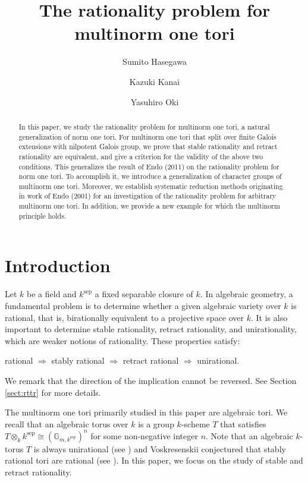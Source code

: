 \documentclass[12pt]{amsart}
\title[Rationality problem]{The rationality problem for multinorm one tori}
\author[S.~Hasegawa]{Sumito Hasegawa}
\author[K.~Kanai]{Kazuki Kanai}
\author[Y.~Oki]{Yasuhiro Oki}
\theoremstyle{plain}
\theoremstyle{definition}
\numberwithin{thm}{section}
\numberwithin{equation}{section}
\newcommand{\G}{\mathbb{G}}
\DeclareMathOperator{\sep}{sep}
\begin{document}
\begin{abstract}
In this paper, we study the rationality problem for multinorm one tori, a natural generalization of norm one tori. 
For multinorm one tori that split over finite Galois extensions with nilpotent Galois group, we prove that stable rationality and retract rationality are equivalent, and give a criterion for the validity of the above two conditions. 
This generalizes the result of Endo (2011) on the rationality problem for norm one tori. 
To accomplish it, 
we introduce a generalization of character groups of multinorm one tori.
Moreover, we establish systematic reduction methods originating in work of Endo (2001) for an investigation of the rationality problem for arbitrary multinorm one tori.
In addition, we provide a new example for which the multinorm principle holds.
\end{abstract}

\maketitle

\tableofcontents

\section{Introduction}

Let $k$ be a field and $k^{\sep}$ a fixed separable closure of $k$.
In algebraic geometry, a fundamental problem is to determine whether a given algebraic variety over $k$ is rational, that is, birationally equivalent to a projective space over $k$. 
It is also important to determine stable rationality, retract rationality, and unirationality, which are weaker notions of rationality. 
These properties satisfy:
\begin{center}
rational $\Rightarrow$ stably rational $\Rightarrow$ 
retract rational $\Rightarrow$ unirational. 
\end{center}
We remark that the direction of the implication cannot be reversed.
See Section \ref{sect:rttr} for more details.

The multinorm one tori primarily studied in this paper are algebraic tori. 
We recall that an algebraic torus over $k$ is a group $k$-scheme $T$ that satisfies
$T\otimes_k k^{\sep}\cong (\G_{m,k^{\sep}})^n$ for some non-negative integer $n$.
Note that an algebraic $k$-torus $T$ is always unirational 
(see \cite[p.~40, Example 21]{Voskresenskii1998})
and Voskresenskii conjectured that stably rational tori are rational (see \cite[p.~68]{Voskresenskii1998}). 
In this paper, we focus on the study of stable and retract rationality. 
\end{document}
